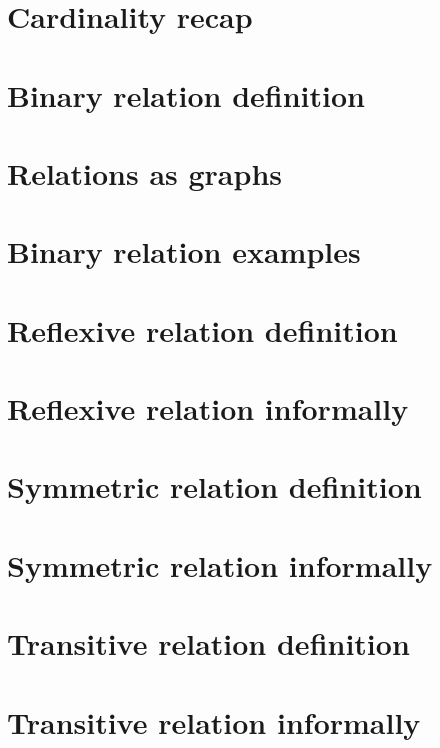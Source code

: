 
\section*{Cardinality recap}

\vfill
\section*{Binary relation definition}

\vfill
\section*{Relations as graphs}

\vfill
\section*{Binary relation examples}

\vfill
\section*{Reflexive relation definition}

\vfill
\section*{Reflexive relation informally}

\vfill
\section*{Symmetric relation definition}

\vfill
\section*{Symmetric relation informally}

\vfill
\section*{Transitive relation definition}

\vfill
\section*{Transitive relation informally}

\vfill
